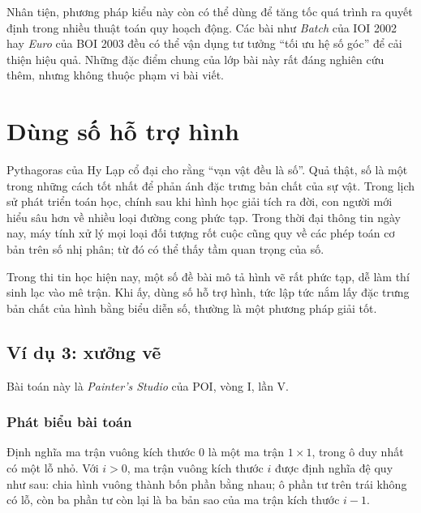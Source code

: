 \documentclass[11pt]{article}
\begin{document}
Nhân tiện, phương pháp kiểu này còn có thể dùng để tăng tốc quá trình ra
quyết định trong nhiều thuật toán quy hoạch động. Các bài như \textit{Batch}
của IOI 2002 hay \textit{Euro} của BOI 2003 đều có thể vận dụng tư tưởng
``tối ưu hệ số góc'' để cải thiện hiệu quả. Những đặc điểm chung của lớp bài
này rất đáng nghiên cứu thêm, nhưng không thuộc phạm vi bài viết.

\section{Dùng số hỗ trợ hình}

Pythagoras của Hy Lạp cổ đại cho rằng ``vạn vật đều là số''. Quả thật, số là
một trong những cách tốt nhất để phản ánh đặc trưng bản chất của sự vật.
Trong lịch sử phát triển toán học, chính sau khi hình học giải tích ra đời,
con người mới hiểu sâu hơn về nhiều loại đường cong phức tạp. Trong thời đại
thông tin ngày nay, máy tính xử lý mọi loại đối tượng rốt cuộc cũng quy về
các phép toán cơ bản trên số nhị phân; từ đó có thể thấy tầm quan trọng của
số.

Trong thi tin học hiện nay, một số đề bài mô tả hình vẽ rất phức tạp, dễ làm
thí sinh lạc vào mê trận. Khi ấy, dùng số hỗ trợ hình, tức lập tức nắm lấy
đặc trưng bản chất của hình bằng biểu diễn số, thường là một phương pháp giải
tốt.

\subsection{Ví dụ 3: xưởng vẽ}

Bài toán này là \textit{Painter's Studio} của POI, vòng I, lần V.

\subsubsection*{Phát biểu bài toán}

Định nghĩa ma trận vuông kích thước $0$ là một ma trận $1\times 1$, trong ô
duy nhất có một lỗ nhỏ. Với $i>0$, ma trận vuông kích thước $i$ được định
nghĩa đệ quy như sau: chia hình vuông thành bốn phần bằng nhau; ô phần tư
trên trái không có lỗ, còn ba phần tư còn lại là ba bản sao của ma trận
kích thước $i-1$.
\end{document}
